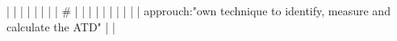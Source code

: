 |    |            |      |                                                                      |                                                                                                                                                                          |                                                                                                                                                                                                                                                            |                                                                                                                                                                                                                                                                      | #                                                                                                                                                                                                                                                                                                        |                                                                                                                                                                                                                                                                                                                                                                                                                                                                                              |
|    |            |      |                                                                      |                                                                                                                                                                          |                                                                                                                                                                                                                                                            |                                                                                                                                                                                                                                                                      | approuch:"own technique to identify, measure and calculate the ATD"                                                                                                                                                                                                                                      |                                                                                                                                                                                                                                                                                                                                                                                                                                                                                              |
